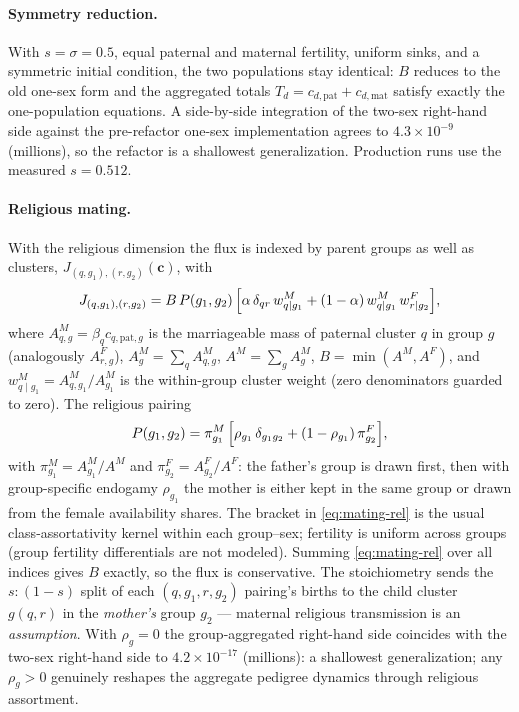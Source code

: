\documentclass[11pt,a4paper]{article}
\begin{document}
\paragraph{Symmetry reduction.}  With $s=\sigma=0.5$, equal paternal and
maternal fertility, uniform sinks, and a symmetric initial condition, the
two populations stay identical: $B$ reduces to the old one-sex form and the
aggregated totals $T_d=c_{d,\mathrm{pat}}+c_{d,\mathrm{mat}}$ satisfy
exactly the one-population equations.  A side-by-side integration of the
two-sex right-hand side against the pre-refactor one-sex implementation
agrees to $4.3\times10^{-9}$ (millions), so the refactor is a shallowest
generalization.  Production runs use the measured $s=0.512$.

\paragraph{Religious mating.}  With the religious dimension the flux is
indexed by parent groups as well as clusters,
$J_{(q,g_1),(r,g_2)}(\mathbf{c})$, with
\begin{equation}
  J_{(q,g_1),(r,g_2)} = B\,
  P(g_1,g_2)\,
  \Bigl[\alpha\,\delta_{qr}\,w^M_{q\mid g_1}
  + (1-\alpha)\,w^M_{q\mid g_1}\,w^F_{r\mid g_2}\Bigr],
  \label{eq:mating-rel}
\end{equation}
where $A^M_{q,g}=\beta_qc_{q,\mathrm{pat},g}$ is the marriageable mass of
paternal cluster $q$ in group $g$ (analogously $A^F_{r,g}$),
$A^M_g=\sum_qA^M_{q,g}$, $A^M=\sum_gA^M_g$, $B=\min(A^M,A^F)$, and
$w^M_{q\mid g_1}=A^M_{q,g_1}/A^M_{g_1}$ is the within-group cluster weight
(zero denominators guarded to zero).  The religious pairing
\begin{equation}
  P(g_1,g_2)=\pi^M_{g_1}\,
  \Bigl[\rho_{g_1}\,\delta_{g_1g_2}
  + (1-\rho_{g_1})\,\pi^F_{g_2}\Bigr],
  \label{eq:pairing}
\end{equation}
with $\pi^M_{g_1}=A^M_{g_1}/A^M$ and $\pi^F_{g_2}=A^F_{g_2}/A^F$: the
father's group is drawn first, then with group-specific endogamy
$\rho_{g_1}$ the mother is either kept in the same group or drawn from the
female availability shares.  The bracket in \eqref{eq:mating-rel} is the
usual class-assortativity kernel within each group--sex; fertility is
uniform across groups (group fertility differentials are not modeled).
Summing \eqref{eq:mating-rel} over all indices gives $B$ exactly, so the
flux is conservative.  The stoichiometry sends the $s{:}(1{-}s)$ split of
each $(q,g_1,r,g_2)$ pairing's births to the child cluster $g(q,r)$ in the
\emph{mother's} group $g_2$ --- maternal religious transmission is an
\emph{assumption}.  With $\rho_g=0$ the group-aggregated right-hand side
coincides with the two-sex right-hand side to $4.2\times10^{-17}$
(millions): a shallowest generalization; any $\rho_g>0$ genuinely reshapes the
aggregate pedigree dynamics through religious assortment.
\end{document}
